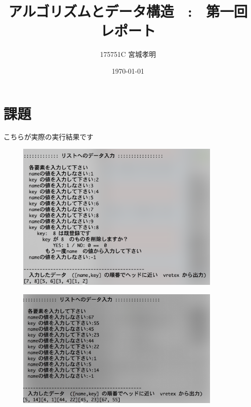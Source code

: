 \documentclass[a4paper,11pt,titlepage]{jarticle}
\title{アルゴリズムとデータ構造　:　第一回レポート}
\author{175751C 宮城孝明}
\date{\today}
\begin{document}
\maketitle
\tableofcontents
\clearpage

\section{課題}
\par
こちらが実際の実行結果です\par
\begin{figure}[htbp]
  \centering
  \includegraphics[width=100mm]{0523.png}
  \label{sample1}\\
\end{figure}

\begin{figure}[htbp]
  \centering
  \includegraphics[width=100mm]{1357.png}
  \label{sample2}\\
\end{figure}
\end{document}
